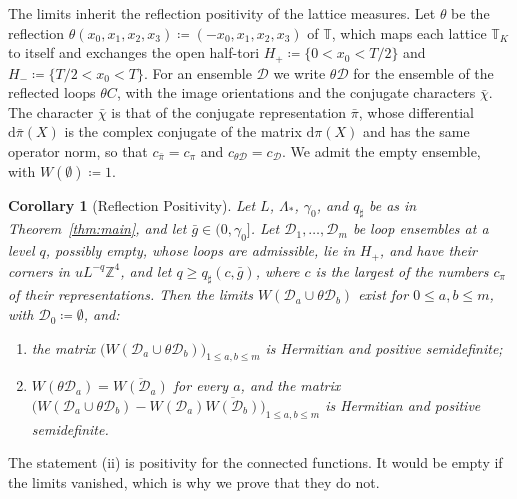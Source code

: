 \documentclass[11pt]{preprint}
\newcommand{\dd}{\mathrm{d}}
\numberwithin{equation}{section}
\newtheorem{corollary}[theorem]{Corollary}
\theoremstyle{definition}
\theoremstyle{remark}
\theoremstyle{plain}
\begin{document}
The limits inherit the reflection positivity of the lattice measures. Let $\theta$ be the reflection $\theta(x_0, x_1, x_2, x_3) \coloneqq (-x_0, x_1, x_2, x_3)$ of $\mathbb T$, which maps each lattice $\mathbb T_K$ to itself and exchanges the open half-tori $H_+ \coloneqq \{ 0 < x_0 < T/2 \}$ and $H_- \coloneqq \{ T/2 < x_0 < T \}$. For an ensemble $\mathcal D$ we write $\theta\mathcal D$ for the ensemble of the reflected loops $\theta C$, with the image orientations and the conjugate characters $\bar\chi$. The character $\bar\chi$ is that of the conjugate representation $\bar\pi$, whose differential $\dd\bar\pi(X)$ is the complex conjugate of the matrix $\dd\pi(X)$ and has the same operator norm, so that $c_{\bar\pi} = c_\pi$ and $c_{\theta\mathcal D} = c_{\mathcal D}$. We admit the empty ensemble, with $W(\emptyset) \coloneqq 1$.

\begin{corollary}[Reflection Positivity]\label{cor:reflection-positivity}
Let $L$, $\Lambda_*$, $\gamma_0$, and $q_\sharp$ be as in Theorem~\ref{thm:main}, and let $\bar g \in (0, \gamma_0]$. Let $\mathcal D_1, \dots, \mathcal D_m$ be loop ensembles at a level $q$, possibly empty, whose loops are admissible, lie in $H_+$, and have their corners in $uL^{-q}\mathbb Z^4$, and let $q \geq q_\sharp(c, \bar g)$, where $c$ is the largest of the numbers $c_\pi$ of their representations. Then the limits $W(\mathcal D_a \cup \theta\mathcal D_b)$ exist for $0 \leq a, b \leq m$, with $\mathcal D_0 \coloneqq \emptyset$, and:
\begin{enumerate}[label=(\roman*)]
\item the matrix $\bigl(W(\mathcal D_a \cup \theta\mathcal D_b)\bigr)_{1 \leq a, b \leq m}$ is Hermitian and positive semidefinite;
\item $W(\theta\mathcal D_a) = \overline{W(\mathcal D_a)}$ for every $a$, and the matrix $\bigl(W(\mathcal D_a \cup \theta\mathcal D_b) - W(\mathcal D_a)\overline{W(\mathcal D_b)}\bigr)_{1 \leq a, b \leq m}$ is Hermitian and positive semidefinite.
\end{enumerate}
\end{corollary}

The statement (ii) is positivity for the connected functions. It would be empty if the limits vanished, which is why we prove that they do not.
\end{document}
